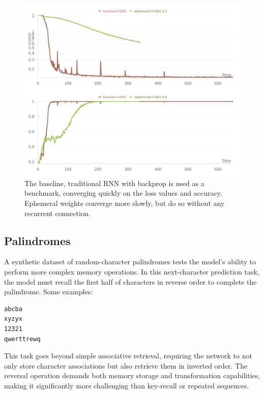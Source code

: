 \documentclass{article} %
\begin{document}
\begin{figure}[h]
\begin{center}
\includegraphics[width=0.8\linewidth]{figure_2.png}
\caption{The baseline, traditional RNN with backprop is used as a benchmark, converging quickly on the loss values and accuracy. Ephemeral weights converge more slowly, but do so without any recurrent connection.}
\label{fig:repeated_sequences}
\end{center}
\end{figure}

\subsection{Palindromes}
A synthetic dataset of random-character palindromes tests the model's ability to perform more complex memory operations. In this next-character prediction task, the model must recall the first half of characters in reverse order to complete the palindrome. Some examples:
\begin{verbatim}
abcba
xyzyx
12321
qwerttrewq
\end{verbatim}

This task goes beyond simple associative retrieval, requiring the network to not only store character associations but also retrieve them in inverted order. The reversal operation demands both memory storage and transformation capabilities, making it significantly more challenging than key-recall or repeated sequences.
\end{document}
